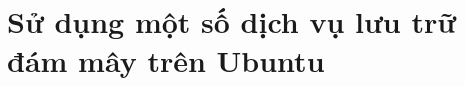 \documentclass[13pt,a4paper]{extreport}
\begin{document}
%
\newpage



\tableofcontents

\newpage
\listoffigures
 

\newpage
{}
\setcounter{page}{1}
\chapter{Sử dụng một số dịch vụ lưu trữ đám mây trên Ubuntu}



\end{document}
